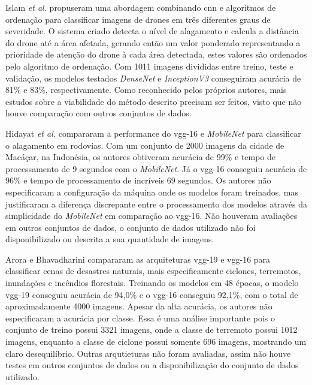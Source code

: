 Islam \textit{et al.}\cite{ISLAM2023100225} propuseram uma abordagem combinando \acrshort{cnn} e algoritmos de ordenação para classificar imagens de drones em três diferentes graus de severidade. 
O sistema criado detecta o nível de alagamento e calcula a distância do drone até a área afetada, 
gerando então um valor ponderado representando a prioridade de atenção do drone à cada área detectada, estes valores são ordenados pelo algoritmo de ordenação. 
Com 1011 imagens divididas entre treino, teste e validação, os modelos testados \textit{DenseNet} e \textit{InceptionV3} conseguiram acurácia de 81\% e 83\%, respectivamente.
Como reconhecido pelos próprios autores, mais estudos sobre a viabilidade do método descrito precisam ser feitos, visto que não houve comparação com outros conjuntos de dados.

Hidayat \textit{et al.}\cite{hidayat2024} compararam a performance do \acrshort{vgg}-16 e \textit{MobileNet} para classificar o alagamento em rodovias.
Com um conjunto de 2000 imagens da cidade de Macáçar, na Indonésia, os autores obtiveram acurácia de 99\% e tempo de processamento de 9 segundos com o \textit{MobileNet}. Já o 
\acrshort{vgg}-16 conseguiu acurácia de 96\% e tempo de processamento de incríveis 69 segundos.
Os autores não especificaram a configuração da máquina onde os modelos foram treinados, mas justificaram a diferença discrepante entre o processamento dos modelos através da simplicidade
do \textit{MobileNet} em comparação ao \acrshort{vgg}-16.
Não houveram avaliações em outros conjuntos de dados, o conjunto de dados utilizado não foi disponibilizado ou descrita a sua quantidade de imagens.

Arora e Bhavadharini \cite{arora2024} compararam as arquiteturas \acrshort{vgg}-19 e \acrshort{vgg}-16 para classificar cenas de desastres naturais, mais especificamente ciclones, terremotos, inundações e incêndios florestais.
Treinando os modelos em 48 épocas, o modelo \acrshort{vgg}-19 conseguiu acurácia de 94,0\% e o \acrshort{vgg}-16 conseguiu 92,1\%, com o total de aproximadamente 4000 imagens.
Apesar da alta acurácia, os autores não especificaram a acurácia por classe. Essa é uma análise importante pois o conjunto de treino possui 3321 imagens, onde a classe de terremoto possui 1012 imagens,
enquanto a classe de ciclone possui somente 696 imagens, mostrando um claro desequilíbrio.
Outras arqutieturas não foram avaliadas, assim não houve testes em outros conjuntos de dados ou a disponibilização do conjunto de dados utilizado.

